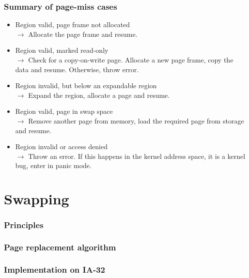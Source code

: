
\begin{frame}
  \frametitle{Summary of page-miss cases}

  \begin{itemize}
  \item
  Region valid, page frame not allocated\\
  $\rightarrow$ Allocate the page frame and resume.
  \item
  Region valid, marked read-only\\
  $\rightarrow$ Check for a copy-on-write page. Allocate a new page
  frame, copy the data and resume. Otherwise, throw error.
  \item
  Region invalid, but below an expandable region\\
  $\rightarrow$ Expand the region, allocate a page and resume.
  \item
  Region valid, page in swap space\\
  $\rightarrow$ Remove another page from memory, load the required
  page from storage and resume.
  \item
  Region invalid or access denied\\
  $\rightarrow$ Throw an error. If this happens in the kernel address
  space, it is a kernel bug, enter in panic mode.
  \end{itemize}

\end{frame}

%
%

\section{Swapping}


\begin{frame}
  \frametitle{Principles}

\end{frame}


\begin{frame}
  \frametitle{Page replacement algorithm}

\end{frame}


\begin{frame}
  \frametitle{Implementation on IA-32}

\end{frame}

